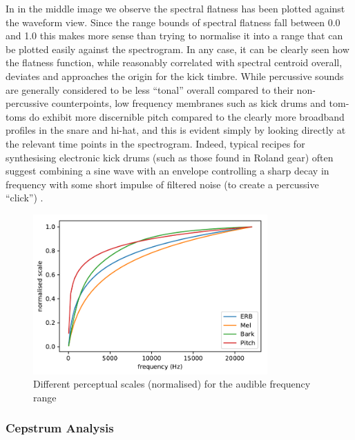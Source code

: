 {{In  in the middle image we observe the spectral flatness has been plotted against the waveform view. Since the range bounds of spectral flatness fall between 0.0 and 1.0 this makes more sense than trying to normalise it into a range that can be plotted easily against the spectrogram. In any case, it can be clearly seen how the flatness function, while reasonably correlated with spectral centroid overall, deviates and approaches the origin for the kick timbre. While percussive sounds are generally considered to be less ``tonal'' overall compared to their non-percussive counterpoints, low frequency membranes such as kick drums and tom-toms do exhibit more discernible pitch compared to the clearly more broadband profiles in the snare and hi-hat, and this is evident simply by looking directly at the relevant time points in the spectrogram. Indeed, typical recipes for synthesising electronic kick drums (such as those found in Roland gear) often suggest combining a sine wave with an envelope controlling a sharp decay in frequency with some short impulse of filtered noise (to create a percussive ``click'') \citep{Risset1999, Reid2002}.

\begin{figure}
	\begin{center}
		\includegraphics[width=0.8\textwidth]{ch05_pyconcat/figures/scale.pdf}
	\end{center}
	\caption[Perceptual scales for audible range]{Different perceptual scales (normalised) for the audible frequency range}
	\label{fig:perceptual_scales}
\end{figure}


\subsubsection{Cepstrum Analysis}

}}
